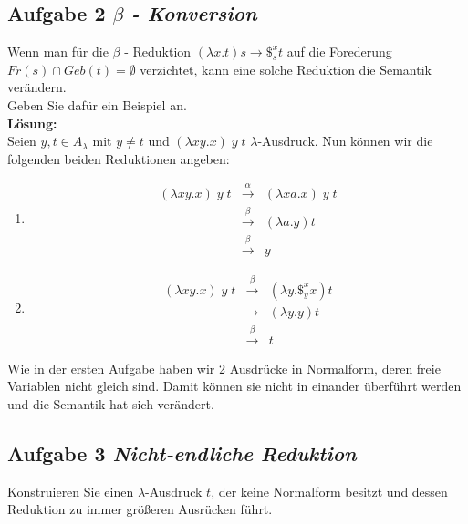 \documentclass[11pt,a4paper,ngerman]{article}
\begin{document}
\subsection*{Aufgabe 2 \mdseries\itshape $\beta$ - Konversion}
Wenn man für die $\beta$ - Reduktion $ (\lambda x.t)s \rightarrow \$_s^ x t$
auf die Forederung $Fr(s)\cap Geb(t) = \emptyset$ verzichtet, kann eine solche Reduktion die Semantik
verändern.\\
Geben Sie dafür ein Beispiel an.\\

\textbf{Lösung:}\\
   Seien $y,t \in A_\lambda$ mit $y \not= t$ und $(\lambda xy.x) \; y \; t$ $\lambda$-Ausdruck.
   Nun können wir die folgenden beiden Reduktionen angeben:
   \begin{enumerate}[1:]
      \item $$\begin{array}{rcl}
            (\lambda xy.x) \; y \; t &\overset{\alpha}{\longrightarrow}& (\lambda xa.x) \; y \; t\\
               &\overset{\beta}{\longrightarrow}& (\lambda a . y) t\\
               &\overset{\beta}{\longrightarrow}& y
         \end{array}$$
      \item $$\begin{array}{rcl}
            (\lambda xy.x) \; y \; t &\overset{\beta}{\longrightarrow}& 
               (\lambda y. \$_y^x x) t\\
               &\longrightarrow& (\lambda y.y) t\\
               &\overset{\beta}{\longrightarrow}& t
         \end{array}$$
   \end{enumerate}
   Wie in der ersten Aufgabe haben wir 2 Ausdrücke in Normalform, deren freie Variablen nicht gleich sind.
   Damit können sie nicht in einander überführt werden und die Semantik hat sich verändert.

\subsection*{Aufgabe 3 \mdseries\itshape Nicht-endliche Reduktion}
Konstruieren Sie einen $\lambda$-Ausdruck $t$, der keine Normalform besitzt und dessen Reduktion
zu immer größeren Ausrücken führt.\\
\end{document}
